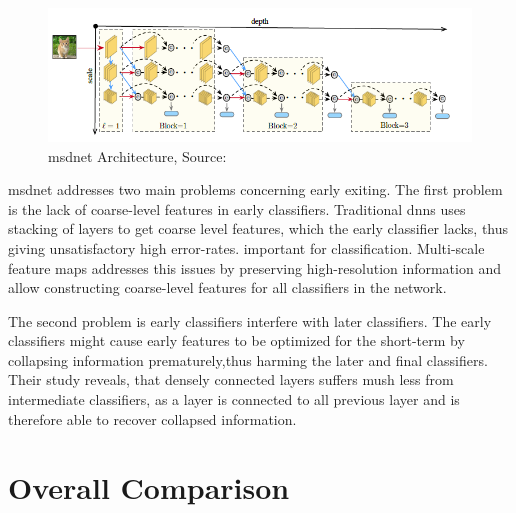 \begin{figure}
	\centering
	\includegraphics[width=\linewidth]{figures/models/msdnet}
	\caption[\gls{msdnet} Architecture]{\gls{msdnet} Architecture, Source:  \cite{huang_multi-scale_2017}}
	\label{fig:msdnet}
\end{figure}

\gls{msdnet} addresses two main problems concerning early exiting. The first problem is the lack of coarse-level features in early classifiers. Traditional \gls{dnn}s uses stacking of layers to get coarse level features, which the early classifier lacks, thus giving unsatisfactory high error-rates. important for classification. Multi-scale feature maps addresses this issues by preserving high-resolution information and allow constructing coarse-level features for all classifiers in the network.

The second problem is early classifiers interfere with later classifiers. The early classifiers might cause early features to be optimized for the short-term by collapsing information prematurely,thus harming the later and final classifiers. Their study reveals, that densely connected layers suffers mush less from intermediate classifiers, as a layer is connected to all previous layer and is therefore able to recover collapsed information.


\section{Overall Comparison}


